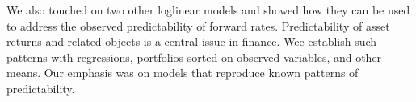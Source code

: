 \documentclass[11pt]{article}
\begin{document}
We also touched on two other loglinear models
and showed how they can be used to address the observed predictability of
forward rates.
Predictability of asset returns and related objects is a central issue
in finance.
Wee establish such patterns with regressions, portfolios sorted on observed variables,
 and other means.
Our emphasis was on models that reproduce known patterns
of predictability.



\end{document}
